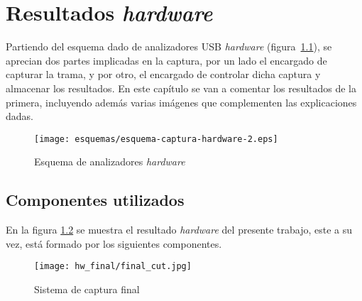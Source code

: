 \chapter{Resultados \emph{hardware}}
\label{ch:resultados_hw}



Partiendo del esquema dado de analizadores USB \emph{hardware} (figura~\ref{fig:esquema-hardware}), se aprecian dos partes implicadas en la captura, por un lado el encargado de capturar la trama, y por otro, el encargado de controlar dicha captura y almacenar los resultados. En este capítulo se van a comentar los resultados de la primera, incluyendo además varias imágenes que complementen las explicaciones dadas.

\begin{figure}[htb]
    \centering
    \texttt{[image: esquemas/esquema-captura-hardware-2.eps]}
    \caption{Esquema de analizadores \emph{hardware}}
    \label{fig:esquema-hardware}
\end{figure}

\section{Componentes utilizados}
En la figura \ref{fig:sistema_final} se muestra el resultado \emph{hardware} del presente trabajo, este a su vez, está formado por los siguientes componentes.

\begin{figure}[htbp]
    \centering
    \texttt{[image: hw\_final/final\_cut.jpg]}
    \caption{Sistema de captura final}
    \label{fig:sistema_final}
\end{figure}

